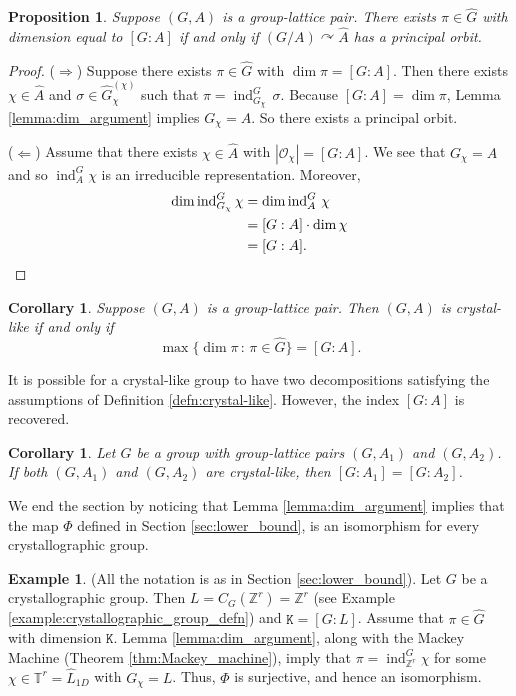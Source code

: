 \documentclass[11pt, twoside]{amsart}
\newcommand{\te}[1]{\operatorname{#1}}
\newcommand{\zn}{\mathbb{Z}}
\newcommand{\mc}{\mathcal}
\newcommand{\mt}{\mathtt}
\newcommand{\wh}{\widehat}
\newtheorem{prop}[thm]{Proposition}
\newtheorem{cor}[thm]{Corollary}
\theoremstyle{definition}
\newtheorem{ex}[thm]{Example}
\newcommand{\B}{\mathbb}
\newcommand{\Z}{\B{Z}}
\newcommand{\TT}{\mathbb{T}}
\begin{document}
\begin{prop}\label{prop:equivalence_faithful_action}
Suppose $(G,A)$ is a group-lattice pair. There exists $\pi\in\wh{G}$ with dimension equal to $[G:A]$ if and only if $(G\slash A)\curvearrowright \widehat{A}$ has a principal orbit.
\end{prop}

\begin{proof}

($\Rightarrow$) Suppose there exists $\pi\in\wh{G}$ with $\dim \pi=[G:A]$. Then there exists $\chi\in\wh{A}$ and $\sigma\in\wh{G}_{\chi}^{(\chi)}$ such that $\pi=\te{ind}_{G_{\chi}}^G\,\sigma$. Because $[G:A]=\dim \pi$, Lemma \ref{lemma:dim_argument} implies  $G_{\chi}=A$. So there exists a principal orbit.

($\Leftarrow$) Assume that there exists $\chi\in\wh{A}$ with $|\mc{O}_{\chi}|=[G:A]$. We see that $G_{\chi}=A$ and so $\te{ind}_A^G \chi$ is an irreducible representation. Moreover, 
\begin{align*}
\dim\te{ind}_{G_{\chi}}^G\chi&=\dim\te{ind}_A^G\,\chi\\
&=[G:A]\cdot\dim\chi\\
&=[G:A].\qedhere
\end{align*}
\end{proof}

\begin{cor}\label{cor:max_dim}
 Suppose $(G,A)$ is a group-lattice pair. Then $(G,A)$ is crystal-like if and only if $$\max\{\dim\pi\,\colon\,\pi\in \widehat{G}\}=[G:A].$$
\end{cor}

It is possible for a crystal-like group to have two decompositions satisfying the assumptions of Definition \ref{defn:crystal-like}. However, the index $[G:A]$ is recovered.

\begin{cor}\label{cor:point_group_order}
Let $G$ be a group with group-lattice pairs $(G,A_1)$ and $(G,A_2)$. If both $(G,A_1)$ and $(G,A_2)$ are crystal-like, then $[G:A_1]=[G:A_2]$.
\end{cor}

We end the section by noticing that Lemma \ref{lemma:dim_argument} implies that the map $\Phi$ defined in Section \ref{sec:lower_bound}, is an isomorphism for every crystallographic group.

\begin{ex}\label{ex:crystallographic_phi_surj}
    (All the notation is as in Section \ref{sec:lower_bound}). Let $G$ be a crystallographic group. Then $L=C_G(\zn^r)=\Z^r$ (see Example \ref{example:crystallographic_group_defn}) and $\mt{K}=[G:L]$. Assume that $\pi\in\wh{G}$ with dimension $\mt{K}$. Lemma \ref{lemma:dim_argument}, along with the Mackey Machine (Theorem \ref{thm:Mackey_machine}), imply that $\pi=\te{ind}_{\Z^r}^G \chi$ for some $\chi\in \TT^r=\wh{L}_{1D}$ with $G_{\chi}=L$. Thus, $\Phi$ is surjective, and hence an isomorphism.
\end{ex}
\end{document}

